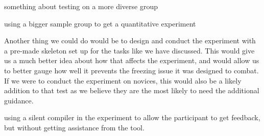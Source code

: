 something about testing on a more diverse group

using a bigger sample group to get a quantitative experiment

Another thing we could do would be to design and conduct the experiment with a pre-made skeleton set up for the tasks like we have discussed.
This would give us a much better idea about how that affects the experiment, and would allow us to better gauge how well it prevents the freezing issue it was designed to combat.
If we were to conduct the experiment on novices, this would also be a likely addition to that test as we believe they are the most likely to need the additional guidance. 

using a silent compiler in the experiment to allow the participant to get feedback, but without getting assistance from the tool.